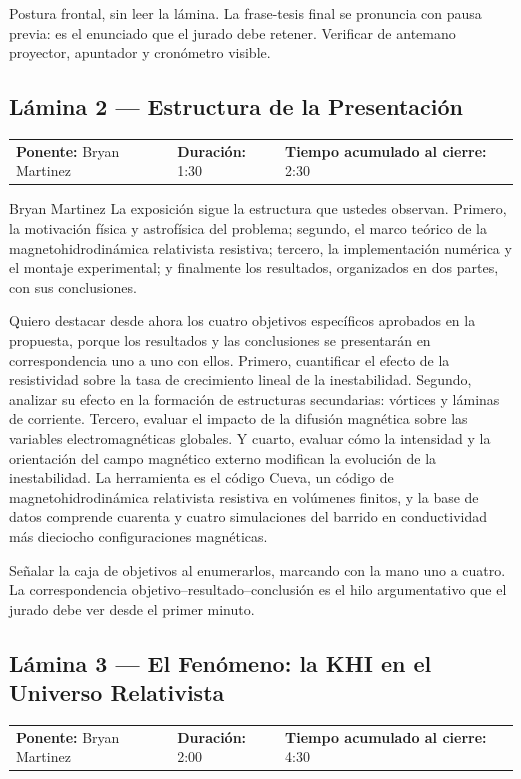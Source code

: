 \documentclass[11pt,letterpaper]{article}
\makeatletter
\newcommand{\lamina}[5]{%
  \subsection*{Lámina #1 --- #2}
  \noindent
  \begin{tabular}{@{}llll@{}}
    \textbf{Ponente:} #3 &\quad \textbf{Duración:} #4 &\quad
    \textbf{Tiempo acumulado al cierre:} #5 &
  \end{tabular}
  \vspace{2pt}}
\makeatother
\begin{document}
\begin{indicaciones}
Postura frontal, sin leer la lámina. La frase-tesis final se pronuncia con
pausa previa: es el enunciado que el jurado debe retener. Verificar de
antemano proyector, apuntador y cronómetro visible.
\end{indicaciones}

\lamina{2}{Estructura de la Presentación}{Bryan Martinez}{1:30}{2:30}

\begin{parlamento}{Bryan Martinez}
La exposición sigue la estructura que ustedes observan. Primero, la
motivación física y astrofísica del problema; segundo, el marco teórico de la
magnetohidrodinámica relativista resistiva; tercero, la implementación
numérica y el montaje experimental; y finalmente los resultados, organizados
en dos partes, con sus conclusiones.

Quiero destacar desde ahora los cuatro objetivos específicos aprobados en la
propuesta, porque los resultados y las conclusiones se presentarán en
correspondencia uno a uno con ellos. Primero, cuantificar el efecto de la
resistividad sobre la tasa de crecimiento lineal de la inestabilidad.
Segundo, analizar su efecto en la formación de estructuras secundarias:
vórtices y láminas de corriente. Tercero, evaluar el impacto de la difusión
magnética sobre las variables electromagnéticas globales. Y cuarto, evaluar
cómo la intensidad y la orientación del campo magnético externo modifican la
evolución de la inestabilidad. La herramienta es el código Cueva, un código
de magnetohidrodinámica relativista resistiva en volúmenes finitos, y la base
de datos comprende cuarenta y cuatro simulaciones del barrido en
conductividad más dieciocho configuraciones magnéticas.
\end{parlamento}

\begin{indicaciones}
Señalar la caja de objetivos al enumerarlos, marcando con la mano uno a
cuatro. La correspondencia objetivo--resultado--conclusión es el hilo
argumentativo que el jurado debe ver desde el primer minuto.
\end{indicaciones}

\lamina{3}{El Fenómeno: la KHI en el Universo Relativista}{Bryan Martinez}{2:00}{4:30}
\end{document}
